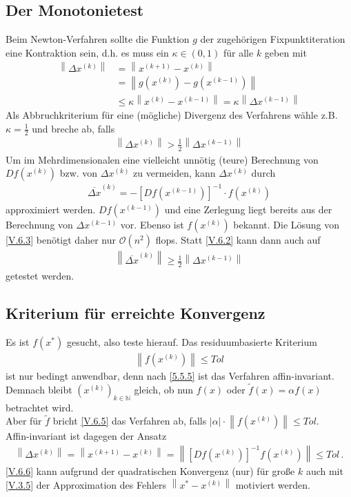 \documentclass[ngerman,fontsize=11pt, paper=a4, parskip=half, titlepage=true, toc=bib]{scrbook}
\theoremstyle{definition}
\theoremstyle{plain}
\newcommand{\N}{\mathds{N}}
\newcommand{\nn}[1]{\left\| #1 \right\|}
\newcommand{\subsectione}[1]{\addtocounter{Def}{1}\subsection{#1}}
\begin{document}
\subsectione{Der Monotonietest}
Beim Newton-Verfahren sollte die Funktion $g$ der zugehörigen
Fixpunktiteration eine Kontraktion sein, d.h. es muss ein 
$\kappa \in (0,1)$ für alle $k$ geben mit
\begin{align}\nonumber
  \nn{\Delta x^{(k)}}&=\nn{x^{(k+1)}-x^{(k)}} \\ \nonumber
                     &= \nn{g(x^{(k)})-g(x^{(k-1)})}\\
                     &\leq \kappa\nn{x^{(k)}-x^{(k-1)}} = \kappa \nn{\Delta x^{(k-1)}}
                       \label{V.6.1}
\end{align}
Als Abbruchkriterium für eine (mögliche) Divergenz des Verfahrens wähle z.B.
$\kappa=\frac{1}{2}$ und breche ab, falls 
\begin{gather}
  \nn{\Delta x^{(k)}}>\frac{1}{2}\nn{\Delta x^{(k-1)}}
  \label{V.6.2}
\end{gather}
Um im Mehrdimensionalen eine vielleicht unnötig (teure) Berechnung
von $Df(x^{(k)})$ bzw. von $\Delta x^{(k)}$ zu vermeiden, kann 
$\Delta x^{(k)}$ durch 
\begin{gather}
  \overline{\Delta x}^{(k)} = -[Df(x^{(k-1)})]^{-1}\cdot f(x^{(k)})
  \label{V.6.3}
\end{gather}
approximiert werden.
$Df(x^{(k-1)})$ und eine Zerlegung liegt bereits aus der Berechnung von $\Delta x^{(k-1)}$ vor.
Ebenso ist $f(x^{(k)})$ bekannt.
Die Lösung von \eqref{V.6.3} benötigt daher nur $\mathcal{O}(n^2)$ flops.
Statt \eqref{V.6.2} kann dann auch auf 
\begin{gather}
  \nn{\overline{\Delta x}^{(k)}} \geq \frac{1}{2} \nn{\Delta x^{(k-1)}}
  \label{V.6.4}
\end{gather}
getestet werden.


\subsectione{Kriterium für erreichte Konvergenz}
Es ist $f(x^{*})$ gesucht, also teste hierauf. Das residuumbasierte Kriterium
\begin{gather}
  \nn{f(x^{(k)})}\leq Tol
  \label{V.6.5}
\end{gather}
ist nur bedingt anwendbar, denn nach \ref{5.5.5} ist das Verfahren affin-invariant.
Demnach bleibt $(x^{(k)})_{k\in\N}$ gleich,
ob nun $f(x)$ oder $\widetilde{f}(x) =\alpha f(x) $ betrachtet wird.\\
Aber für $\widetilde{f}$ bricht \eqref{V.6.5} das Verfahren ab, 
falls $|\alpha|\cdot \nn{f(x^{(k)})} \leq Tol$. \\
Affin-invariant ist dagegen der Ansatz
\begin{gather}
  \nn{\Delta x^{(k)}}= \nn{x^{(k+1)}-x^{(k)}} 
  = \nn{[Df(x^{(k)})]^{-1}f(x^{(k)})} 
  \leq Tol \, .
  \label{V.6.6}
\end{gather}
\eqref{V.6.6} kann aufgrund der quadratischen Konvergenz (nur) für 
große $k$ auch mit \eqref{V.3.5} der Approximation des Fehlers 
$\nn{x^{*}-x^{(k)}} $ motiviert werden.
\end{document}
